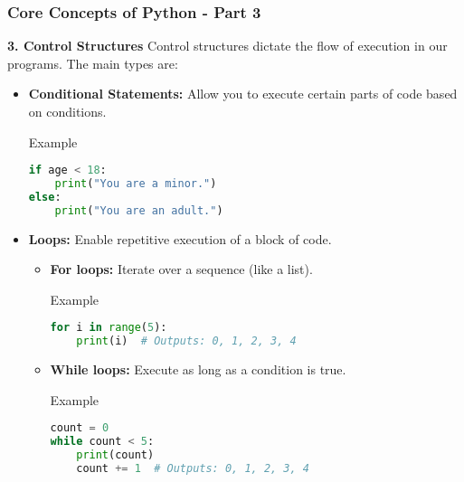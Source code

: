 \documentclass{beamer}
\begin{document}
\begin{frame}[fragile]
    \frametitle{Core Concepts of Python - Part 3}
    \textbf{3. Control Structures}
    Control structures dictate the flow of execution in our programs. The main types are:
    
    \begin{itemize}
        \item \textbf{Conditional Statements:} Allow you to execute certain parts of code based on conditions.
        \begin{block}{Example}
        \begin{lstlisting}[language=Python]
if age < 18:
    print("You are a minor.")
else:
    print("You are an adult.")
        \end{lstlisting}
        \end{block}
        
        \item \textbf{Loops:} Enable repetitive execution of a block of code.
        \begin{itemize}
            \item \textbf{For loops:} Iterate over a sequence (like a list).
            \begin{block}{Example}
            \begin{lstlisting}[language=Python]
for i in range(5):
    print(i)  # Outputs: 0, 1, 2, 3, 4
            \end{lstlisting}
            \end{block}
            \item \textbf{While loops:} Execute as long as a condition is true.
            \begin{block}{Example}
            \begin{lstlisting}[language=Python]
count = 0
while count < 5:
    print(count)
    count += 1  # Outputs: 0, 1, 2, 3, 4
            \end{lstlisting}
            \end{block}
        \end{itemize}
    \end{itemize}
\end{frame}
\end{document}
